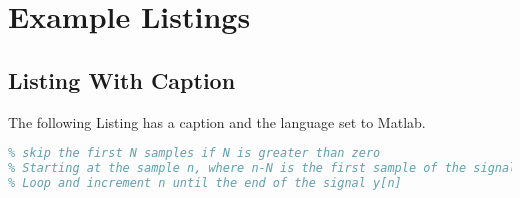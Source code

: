 %
%

\section{Example Listings}
\subsection{Listing With Caption}

The following Listing has a caption and the language set to Matlab.

\begin{lstlisting}[caption=Psudo code for echo cancellation.,language=matlab]
% for a sampled signal y_1[n] create an output signal y_2[n] that will be the size of the input signal minus N samples, where N is the timeshift
% skip the first N samples if N is greater than zero
% Starting at the sample n, where n-N is the first sample of the signal y subtract to it y[n-N]*alpha, where alpha is a value between 0 and 1. 
% Loop and increment n until the end of the signal y[n]
\end{lstlisting}

